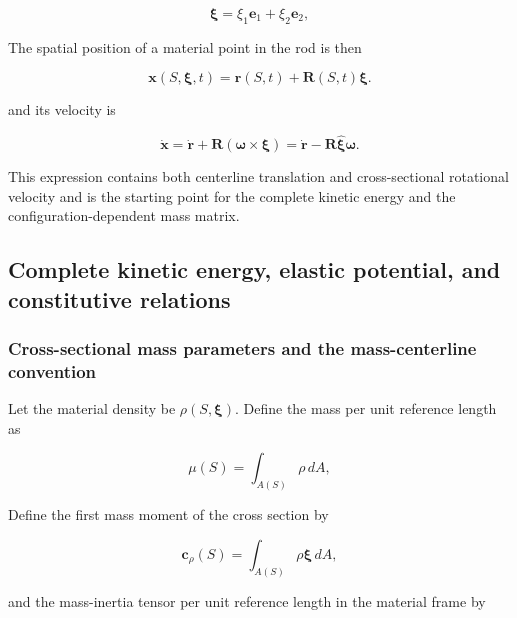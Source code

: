 \begin{equation}
\label{eq:rod-1-20}
\bm{\xi} = \xi_{1}\mathbf{e}_{1} + \xi_{2}\mathbf{e}_{2},
\end{equation}

The spatial position of a material point in the rod is then

\begin{equation}
\label{eq:rod-1-21}
\mathbf{x}\left( S,\bm{\xi},t \right) = \mathbf{r}(S,t) + \mathbf{R}(S,t)\bm{\xi}.
\end{equation}

and its velocity is

\begin{equation}
\label{eq:rod-1-22}
\dot{\mathbf{x}} = \dot{\mathbf{r}} + \mathbf{R}\left( \bm{\omega} \times \bm{\xi} \right) = \dot{\mathbf{r}} - \mathbf{R}\widehat{\bm{\xi}}\bm{\omega}.
\end{equation}

This expression contains both centerline translation and cross-sectional rotational velocity and is the starting point for the complete kinetic energy and the configuration-dependent mass matrix.

\subsection{Complete kinetic energy, elastic potential, and constitutive relations}\label{sec:rod-1-3}

\subsubsection{Cross-sectional mass parameters and the mass-centerline convention}\label{sec:rod-1-3-1}

Let the material density be \(\rho\left( S,\bm{\xi} \right)\). Define the mass per unit reference length as

\begin{equation}
\label{eq:rod-1-23}
\mu(S) = \int_{A(S)}^{}\rho\, dA,
\end{equation}

Define the first mass moment of the cross section by

\begin{equation}
\label{eq:rod-1-24}
\mathbf{c}_{\rho}(S) = \int_{A(S)}^{}\rho\bm{\xi}\, dA,
\end{equation}

and the mass-inertia tensor per unit reference length in the material frame by

